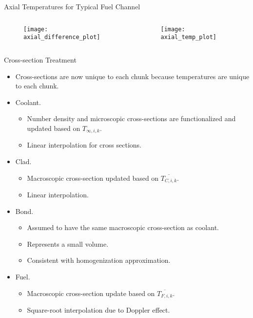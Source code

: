 \begin{frame}{Axial Temperatures for Typical Fuel Channel}
  \begin{columns}
    \begin{column}{0.5\textwidth}
      \begin{figure}
        \centering
        \texttt{[image: axial\_difference\_plot]}
        \label{fig:axial_difference_plot}
      \end{figure}
    \end{column}
    \begin{column}{0.5\textwidth}
      \begin{figure}
        \centering
        \texttt{[image: axial\_temp\_plot]}
        \label{fig:axial_temp_plot}
      \end{figure}
    \end{column}
  \end{columns}
\end{frame}

\begin{frame}{Cross-section Treatment}
  \begin{itemize}
    \item Cross-sections are now unique to each chunk because temperatures are
      unique to each chunk.
    \item Coolant. 
      \begin{itemize}
        \item Number density and microscopic cross-sections are functionalized 
          and updated based on $T_{\infty,i,k}$.
        \item Linear interpolation for cross sections.
      \end{itemize}
    \item Clad. 
      \begin{itemize}
        \item Macroscopic cross-section updated based on $\overline{T_{C,i,k}}$.
        \item Linear interpolation.
      \end{itemize}
    \item Bond.
      \begin{itemize}
        \item Assumed to have the same macroscopic cross-section as coolant.
        \item Represents a small volume.
        \item Consistent with homogenization approximation.
      \end{itemize}
    \item Fuel.
      \begin{itemize}
        \item Macroscopic cross-section update based on $\overline{T_{F,i,k}}$.
        \item Square-root interpolation due to Doppler effect.
      \end{itemize}
  \end{itemize}
\end{frame}

